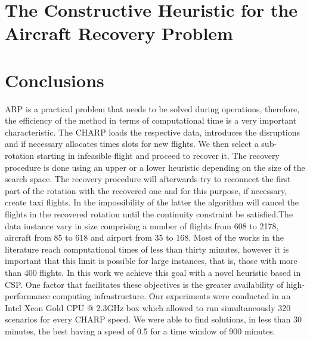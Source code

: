 \documentclass[ijoo,nonblindrev]{informs-ijoo}
\begin{document}
\section{The Constructive Heuristic for the Aircraft Recovery Problem}\label{sec:algorithms}






\section{Conclusions}\label{sec:conclusions}

ARP is a practical problem that needs to be solved during operations, therefore, the efficiency of the method in terms of computational time is a very important characteristic.
The CHARP loads the respective data, introduces the disruptions and if necessary allocates times slots for new flights. We then select a sub-rotation starting in infeasible flight and proceed to recover it. The recovery procedure is done using an upper or a lower heuristic depending on the size of the search space. The recovery procedure will afterwards try to reconnect the first part of the rotation with the recovered one and for this purpose, if necessary, create taxi flights. In the impossibility of the latter the algorithm will cancel the flights in the recovered rotation until the continuity constraint be satisfied.The data instance vary in size comprising a number of flights from 608 to  2178, aircraft from 85 to 618 and airport from 35 to 168.
 Most of the works in the literature reach computational times of less than thirty minutes, however it is important that this limit is possible for large instances, that is, those with more than 400 flights. In this work we achieve this goal with a novel heuristic based in CSP. One factor that facilitates these objectives is the greater availability of high-performance computing infrastructure. Our experiments were conducted in an Intel Xeon Gold CPU @ 2.3GHz box which allowed to run simultaneously 320 scenarios for every CHARP speed.
We were able to find solutions, in less than 30 minutes, the best having a speed of 0.5 for a time window of 900 minutes. 



%
%
%
\end{document}
